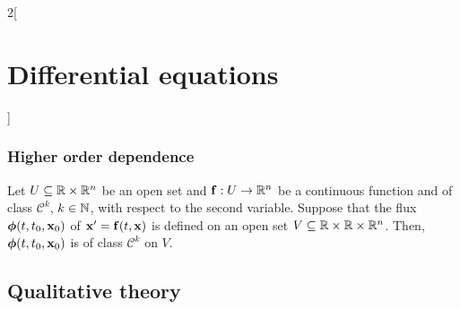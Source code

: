 \documentclass[../../../main.tex]{subfiles}
\begin{document}
\begin{multicols}{2}[\section{Differential equations}]
    \subsubsection{Higher order dependence}
    \begin{theorem}
        Let $U\subseteq\mathbb{R}\times\mathbb{R}^n$ be an open set and $\boldsymbol{\mathrm{f}}:U\rightarrow\mathbb{R}^n$ be a continuous function and of class $\mathcal{C}^k$, $k\in\mathbb{N}$, with respect to the second variable. Suppose that the flux $\boldsymbol{\mathrm{\phi}}(t,t_0,\boldsymbol{\mathrm{x}}_0)$ of $\boldsymbol{\mathrm{x}}'=\boldsymbol{\mathrm{f}}(t,\boldsymbol{\mathrm{x}})$ is defined on an open set $V\subseteq\mathbb{R}\times\mathbb{R}\times\mathbb{R}^n$. Then, $\boldsymbol{\mathrm{\phi}}(t,t_0,\boldsymbol{\mathrm{x}}_0)$ is of class $\mathcal{C}^k$ on $V$.
    \end{theorem}
    \subsection{Qualitative theory}

\end{multicols}
\end{document}
